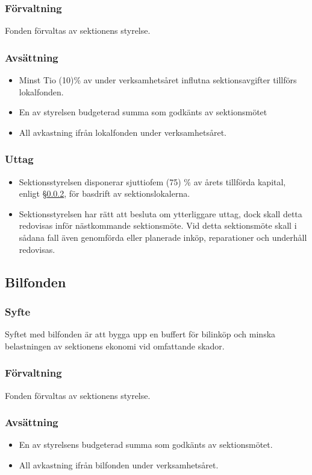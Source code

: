 \documentclass[a4paper, 10pt]{article}
\begin{document}
\subsubsection{Förvaltning}
Fonden förvaltas av sektionens styrelse.
\subsubsection{Avsättning}
\label{sec:lokalfond_avsattning}
\begin{itemize}
\item Minst Tio (10)\% av under verksamhetsåret influtna sektionsavgifter tillförs lokalfonden.
\item En av styrelsen budgeterad summa som godkänts av sektionsmötet
\item All avkastning ifrån lokalfonden under verksamhetsåret.
\end{itemize}
\subsubsection{Uttag}
\begin{itemize}
\item Sektionsstyrelsen disponerar sjuttiofem (75) \% av årets tillförda kapital,
enligt \S\ref{sec:lokalfond_avsattning}, för basdrift av sektionslokalerna.
\item Sektionsstyrelsen har rätt att besluta om ytterliggare uttag, dock skall detta redovisas inför nästkommande sektionsmöte. Vid detta sektionsmöte skall i sådana fall även genomförda eller planerade inköp, reparationer och underhåll redovisas.
\end{itemize}

\subsection{Bilfonden}
\subsubsection{Syfte}
\label{sec:bilfond_syfte}
Syftet med bilfonden är att bygga upp en buffert för bilinköp och minska belastningen av sektionens ekonomi vid omfattande skador.
\subsubsection{Förvaltning}
Fonden förvaltas av sektionens styrelse.
\subsubsection{Avsättning}
\begin{itemize}
\item En av styrelsens budgeterad summa som godkänts av sektionsmötet.
\item All avkastning ifrån bilfonden under verksamhetsåret.
\end{itemize}
\end{document}
